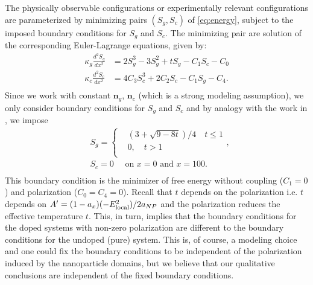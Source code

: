 \documentclass[reprint,amsfonts,amsmath,amssymb,aps,pre,floatfix,10pt]{revtex4-1}
\newcommand\n{\mathbf{n}}
\begin{document}
The physically observable configurations or experimentally relevant configurations are parameterized by minimizing pairs $(S_g, S_c)$ of \eqref{eq:energy}, subject to the imposed boundary conditions for $S_g$ and $S_c$. The minimizing pair are solution of the corresponding Euler-Lagrange equations, given by:
\begin{equation}\label{EL_S}
\begin{aligned}
  \kappa_g \frac{d^2 S_g}{d x^2} &= 2 S_g^3 - 3  S_g^2 +  t  S_g - C_1 S_c - C_0  \\
  \kappa_c \frac{d^2 S_c}{d x^2} &=4 C_3 S_c^3+ 2 C_2 S_c - C_1 S_g - C_4.  \\
  \end{aligned}
\end{equation}
Since we work with constant $\n_g$, $\n_c$ (which is a strong modeling assumption), we only consider boundary conditions for $S_g$ and $S_c$ and by analogy with the work in \cite{patranabish2019one_37}, we impose 
\begin{equation}\label{BC_t}
\begin{aligned}
  & S_g = \begin{cases} 
    & (3+\sqrt{9-8 t}) / 4 \quad t \leq 1 \\ 
    & 0, \quad t > 1 \\
  \end{cases},  \\  
 &  S_c=0 \quad \text { on } x=0 \text { and } x=100. \\
  \end{aligned}
\end{equation}
This boundary condition is the minimizer of free energy without coupling ($C_1 = 0$) and polarization ($C_0 = C_4 = 0$).
Recall that $t$ depends on the polarization i.e. $t$ depends on $A' = (1 - a_x) (- E_{\rm local}^2)/ 2 a_{NP}$ and the polarization reduces the effective temperature $t$. This, in turn, implies that the boundary conditions for the doped systems with non-zero polarization are different to the boundary conditions for the undoped (pure) system. This is, of course, a modeling choice and one could fix the boundary conditions to be independent of the polarization induced by the nanoparticle domains, but we believe that our qualitative conclusions are independent of the fixed boundary conditions.
\end{document}
